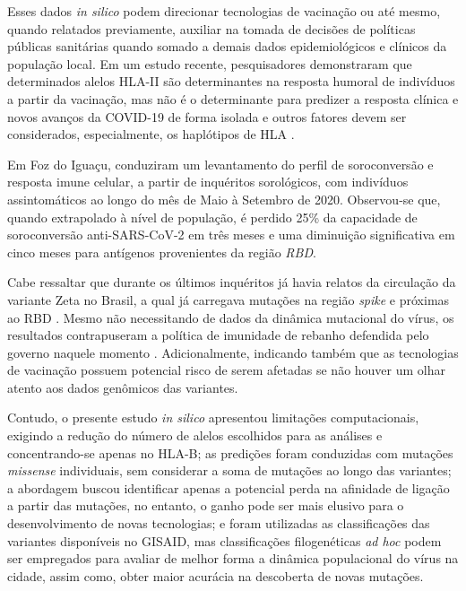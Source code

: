 \begin{justifying}
Esses dados \textit{in silico} podem direcionar tecnologias de vacinação ou até mesmo, quando relatados previamente, auxiliar na tomada de decisões de políticas públicas sanitárias quando somado a demais dados epidemiológicos e clínicos da população local. Em um estudo recente, pesquisadores demonstraram que determinados alelos HLA-II são determinantes na resposta humoral de indivíduos a partir da vacinação, mas não é o determinante para predizer a resposta clínica e novos avanços da COVID-19 de forma isolada e outros fatores devem ser considerados, especialmente, os haplótipos de HLA \cite{Olafsdottir:2022}. 

Em Foz do Iguaçu,   conduziram um levantamento do perfil de soroconversão e resposta imune celular, a partir de inquéritos sorológicos, com indivíduos assintomáticos ao longo do mês de Maio à Setembro de 2020. Observou-se que, quando extrapolado à nível de população, é perdido 25\% da capacidade de soroconversão anti-SARS-CoV-2 em três meses e uma diminuição significativa em cinco meses para antígenos provenientes da região \textit{RBD}. 

Cabe ressaltar que durante os últimos inquéritos já havia relatos da circulação da variante Zeta no Brasil, a qual já carregava mutações na região \textit{spike} e próximas ao RBD \cite{Giovanetti:2022}. Mesmo não necessitando de dados da dinâmica mutacional do vírus, os resultados contrapuseram a política de imunidade de rebanho defendida pelo governo naquele momento \cite{Gurgel:2021, unila:2020}. Adicionalmente, indicando também que as tecnologias de vacinação possuem potencial risco de serem afetadas se não houver um olhar atento aos dados genômicos das variantes.

Contudo, o presente estudo \textit{in silico} apresentou limitações computacionais, exigindo a redução do número de alelos escolhidos para as análises e concentrando-se apenas no HLA-B; as predições foram conduzidas com mutações \textit{missense} individuais, sem considerar a soma de mutações ao longo das variantes; a abordagem buscou identificar apenas a potencial perda na afinidade de ligação a partir das mutações, no entanto, o ganho pode ser mais elusivo para o desenvolvimento de novas tecnologias; e  foram utilizadas as classificações das variantes disponíveis no GISAID, mas classificações filogenéticas \textit{ad hoc} podem ser empregados para avaliar de melhor forma a dinâmica populacional do vírus na cidade, assim como, obter maior acurácia na descoberta de novas mutações.

\end{justifying}